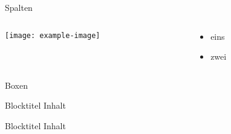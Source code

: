 \documentclass[
	aspectratio=169, %
	]{beamer}
\begin{document}
\begin{frame}{Spalten}

\begin{columns}
	\begin{column}{.5\linewidth}%
	\texttt{[image: example-image]}
	\end{column}

	\begin{column}{.3\linewidth}
	\begin{itemize}
		\item eins
		\item zwei
	\end{itemize}
	\end{column}
\end{columns}

\end{frame}

\begin{frame}{Boxen}
\begin{block}{Blocktitel}
Inhalt
\end{block}

\begin{block}{Blocktitel}
	Inhalt
\end{block}

\end{frame}
\end{document}
